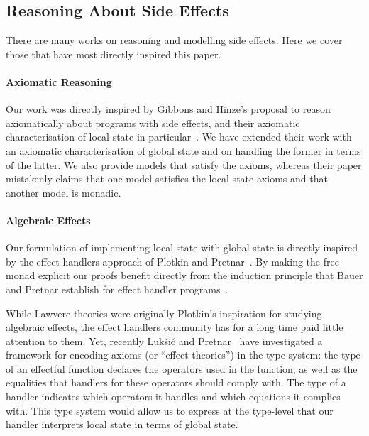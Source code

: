 \documentclass{jfp}
\begin{document}
\subsection{Reasoning About Side Effects}

There are many works on reasoning and modelling side effects. Here we cover
those that have most directly inspired this paper.

\paragraph{Axiomatic Reasoning}

Our work was directly inspired by Gibbons and Hinze's proposal to reason
axiomatically about programs with side effects, and their axiomatic
characterisation of local state in particular~\cite{GibbonsHinze:11:Just}. We
have extended their work with an axiomatic characterisation of global state and
on handling the former in terms of the latter. We also provide models that
satisfy the axioms, whereas their paper mistakenly claims that one model
satisfies the local state axioms and that another model is monadic.


\paragraph{Algebraic Effects}

Our formulation of implementing local state with global state is directly
inspired by the effect handlers approach of Plotkin and
Pretnar~\cite{Plotkin:09:Handlers}. By making the free monad explicit our
proofs benefit directly from the induction principle that Bauer and Pretnar
establish for effect handler programs~\cite{DBLP:journals/corr/BauerP13}.

While Lawvere theories were originally Plotkin's inspiration for studying
algebraic effects, the effect handlers community has for a long time paid
little attention to them. Yet, recently Luk\v{s}i\v{c} and
Pretnar~\cite{Pretnar:19} have investigated a framework for encoding axioms (or
``effect theories'') in the type system: the type of an effectful function
declares the operators used in the function, as well as the equalities that
handlers for these operators should comply with.  The type of a handler
indicates which operators it handles and which equations it complies with.
This type system would allow us to express at the type-level that our
handler interprets local state in terms of global state.
\end{document}

